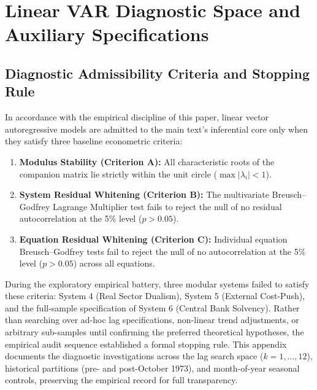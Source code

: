 \section{Linear VAR Diagnostic Space and Auxiliary Specifications}
\label{app:linear_var_diagnostics}

\subsection{Diagnostic Admissibility Criteria and Stopping Rule}
In accordance with the empirical discipline of this paper, linear vector autoregressive models are admitted to the main text's inferential core only when they satisfy three baseline econometric criteria:
\begin{enumerate}
    \item \textbf{Modulus Stability (Criterion A):} All characteristic roots of the companion matrix lie strictly within the unit circle ($\max |\lambda_i| < 1$).
    \item \textbf{System Residual Whitening (Criterion B):} The multivariate Breusch--Godfrey Lagrange Multiplier test fails to reject the null of no residual autocorrelation at the 5\% level ($p > 0.05$).
    \item \textbf{Equation Residual Whitening (Criterion C):} Individual equation Breusch--Godfrey tests fail to reject the null of no autocorrelation at the 5\% level ($p > 0.05$) across all equations.
\end{enumerate}

During the exploratory empirical battery, three modular systems failed to satisfy these criteria: System 4 (Real Sector Dualism), System 5 (External Cost-Push), and the full-sample specification of System 6 (Central Bank Solvency). Rather than searching over ad-hoc lag specifications, non-linear trend adjustments, or arbitrary sub-samples until confirming the preferred theoretical hypotheses, the empirical audit sequence established a formal stopping rule. This appendix documents the diagnostic investigations across the lag search space ($k = 1, \dots, 12$), historical partitions (pre- and post-October 1973), and month-of-year seasonal controls, preserving the empirical record for full transparency.

